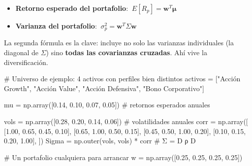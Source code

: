 \documentclass[
  spanish,
  letterpaper,
  DIV=11,
  numbers=noendperiod]{scrreprt}
\newenvironment{Shaded}{\begin{snugshade}}{\end{snugshade}}
\newcommand{\CommentTok}[1]{\textcolor[rgb]{0.37,0.37,0.37}{#1}}
\newcommand{\FloatTok}[1]{\textcolor[rgb]{0.68,0.00,0.00}{#1}}
\newcommand{\NormalTok}[1]{\textcolor[rgb]{0.00,0.23,0.31}{#1}}
\newcommand{\OperatorTok}[1]{\textcolor[rgb]{0.37,0.37,0.37}{#1}}
\newcommand{\StringTok}[1]{\textcolor[rgb]{0.13,0.47,0.30}{#1}}
\providecommand{\tightlist}{%
  \setlength{\itemsep}{0pt}\setlength{\parskip}{0pt}}
\begin{document}
\begin{itemize}
\tightlist
\item
  \textbf{Retorno esperado del portafolio}:
  \(\ E[R_p] = \mathbf{w}^T \boldsymbol{\mu}\)
\item
  \textbf{Varianza del portafolio}:
  \(\ \sigma_p^2 = \mathbf{w}^T \Sigma \mathbf{w}\)
\end{itemize}

La segunda fórmula es la clave: incluye no solo las varianzas
individuales (la diagonal de \(\Sigma\)) sino \textbf{todas las
covarianzas cruzadas}. Ahí vive la diversificación.

\label{universo}
\begin{Shaded}
\begin{Highlighting}[]
\CommentTok{\# Universo de ejemplo: 4 activos con perfiles bien distintos}
\NormalTok{activos }\OperatorTok{=}\NormalTok{ [}\StringTok{"Acción Growth"}\NormalTok{, }\StringTok{"Acción Value"}\NormalTok{, }\StringTok{"Acción Defensiva"}\NormalTok{, }\StringTok{"Bono Corporativo"}\NormalTok{]}

\NormalTok{mu }\OperatorTok{=}\NormalTok{ np.array([}\FloatTok{0.14}\NormalTok{, }\FloatTok{0.10}\NormalTok{, }\FloatTok{0.07}\NormalTok{, }\FloatTok{0.05}\NormalTok{])      }\CommentTok{\# retornos esperados anuales}

\NormalTok{vols }\OperatorTok{=}\NormalTok{ np.array([}\FloatTok{0.28}\NormalTok{, }\FloatTok{0.20}\NormalTok{, }\FloatTok{0.14}\NormalTok{, }\FloatTok{0.06}\NormalTok{])    }\CommentTok{\# volatilidades anuales}
\NormalTok{corr }\OperatorTok{=}\NormalTok{ np.array([}
\NormalTok{    [}\FloatTok{1.00}\NormalTok{, }\FloatTok{0.65}\NormalTok{, }\FloatTok{0.45}\NormalTok{, }\FloatTok{0.10}\NormalTok{],}
\NormalTok{    [}\FloatTok{0.65}\NormalTok{, }\FloatTok{1.00}\NormalTok{, }\FloatTok{0.50}\NormalTok{, }\FloatTok{0.15}\NormalTok{],}
\NormalTok{    [}\FloatTok{0.45}\NormalTok{, }\FloatTok{0.50}\NormalTok{, }\FloatTok{1.00}\NormalTok{, }\FloatTok{0.20}\NormalTok{],}
\NormalTok{    [}\FloatTok{0.10}\NormalTok{, }\FloatTok{0.15}\NormalTok{, }\FloatTok{0.20}\NormalTok{, }\FloatTok{1.00}\NormalTok{],}
\NormalTok{])}
\NormalTok{Sigma }\OperatorTok{=}\NormalTok{ np.outer(vols, vols) }\OperatorTok{*}\NormalTok{ corr           }\CommentTok{\# Σ = D ρ D}

\CommentTok{\# Un portafolio cualquiera para arrancar}
\NormalTok{w }\OperatorTok{=}\NormalTok{ np.array([}\FloatTok{0.25}\NormalTok{, }\FloatTok{0.25}\NormalTok{, }\FloatTok{0.25}\NormalTok{, }\FloatTok{0.25}\NormalTok{])}


\end{Highlighting}
\end{Shaded}
\end{document}
